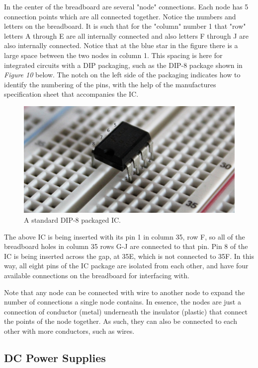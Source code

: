 \documentclass[12pt]{article}
\begin{document}
In the center of the breadboard are several "node" connections. Each node has 5 connection points which are all connected together. Notice the numbers and letters on the breadboard. It is such that for the "column" number 1 that "row" letters A through E are all internally connected and also letters F through J are also internally connected. Notice that at the blue star in the figure there is a large space between the two nodes in column 1. This spacing is here for integrated circuits with a DIP packaging, such as the DIP-8 package shown in \textit{Figure 10} below. The notch on the left side of the packaging indicates how to identify the numbering of the pins, with the help of the manufactures specification sheet that accompanies the IC. 

\begin{figure}[H]
    \centering
    \includegraphics[width=12cm]{photos/prelim/DIP8.png}
    \caption{A standard DIP-8 packaged IC.}
\end{figure}

The above IC is being inserted with its pin 1 in column 35, row F, so all of the breadboard holes in column 35 rows G-J are connected to that pin. Pin 8 of the IC is being inserted across the gap, at 35E, which is not connected to 35F. In this way, all eight pins of the IC package are isolated from each other, and have four available connections on the breadboard for interfacing with.

Note that any node can be connected with wire to another node to expand the number of connections a single node contains. In essence, the nodes are just a connection of conductor (metal) underneath the insulator (plastic) that connect the points of the node together. As such, they can also be connected to each other with more conductors, such as wires.

\subsection{DC Power Supplies}
\end{document}
